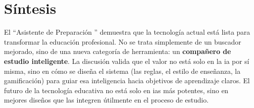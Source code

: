 \section{Síntesis}

El \enquote{Asistente de Preparación } demuestra que la tecnología actual está lista para transformar la educación profesional. No se trata simplemente de un buscador mejorado, sino de una nueva categoría de herramienta: un \textbf{compañero de estudio inteligente}.
La discusión valida que el valor no está solo en la \gls{ia} por sí misma, sino en cómo se diseña el sistema (las reglas, el estilo de enseñanza, la gamificación) para guiar esa inteligencia hacia objetivos de aprendizaje claros. El futuro de la tecnología educativa no está solo en \glspl{ia} más potentes, sino en mejores diseños que las integren útilmente en el proceso de estudio.
